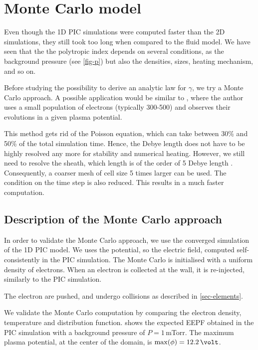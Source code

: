 
\section{Monte Carlo model}
\label{sec-MCM}

  Even though the \ac{1D} \ac{PIC} simulations were computed faster than the \ac{2D} simulations, they still took too long when compared to the fluid model.
  We have seen that the the polytropic index depends on several conditions, as the background pressure (see \cref{fig-p}) but also the densities, sizes, heating mechanism, and so on.

  Before studying the possibility to derive an analytic law for $\gamma$, we try a Monte Carlo approach.
  A possible application would be similar to \citet{kushner1983}, where the author uses a small population of electrons (typically 300-500) and observes their evolutions in a given plasma potential.
  
  This method gets rid of the Poisson equation, which can take between 30\% and 50\% of the total simulation time.
  Hence, the Debye length does not have to be highly resolved any more for stability and numerical heating.
  However, we still need to resolve the sheath, which length is of the order of 5 Debye length \citep{chabert2014}.
  Consequently, a coarser mesh of cell size 5 times larger can be used.
  The condition on the time step is also reduced.
  This results in a much faster computation.

\subsection{Description of the Monte Carlo approach}

In order to validate the Monte Carlo approach, we use the converged simulation of the \ac{1D} \ac{PIC} model.
We uses the potential, so the electric field, computed self-consistently in the \ac{PIC} simulation.
The Monte Carlo is initialised with a uniform density of electrons.
When an electron is collected at the wall, it is re-injected, similarly to the \ac{PIC} simulation.

The electron are pushed, and undergo collisions as described in \cref{sec-elements}.

\vspace{1em}
We validate the Monte Carlo computation by comparing the electron density, temperature and distribution function.
 shows the expected EEPF obtained in the \ac{PIC} simulation with a background pressure of $P=1$\,mTorr.
The maximum plasma potential, at the center of the domain, is $\max(\phi)=12.2\,\volt$.


